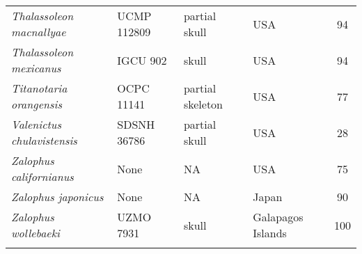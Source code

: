 \begin{longtable}{p{}p{}p{}lc}
\textit{Thalassoleon macnallyae} &	UCMP 112809 & 	partial skull & 	USA & 94\\
\textit{Thalassoleon mexicanus} &	IGCU 902 & 	skull & 	USA & 94\\
\textit{Titanotaria orangensis} &	OCPC 11141 & 	partial skeleton & 	USA & 77\\
\textit{Valenictus chulavistensis} &	SDSNH 36786 & 	partial skull & 	USA & 28\\
\textit{Zalophus californianus} &	None & 	NA & 	USA	 & 75\\
\textit{Zalophus japonicus} &	None & 	NA & 	Japan & 90\\
\textit{Zalophus wollebaeki} &	UZMO 7931 & skull & 	Galapagos Islands & 100\\
\hline

\label{table-taxa}
\end{longtable}
